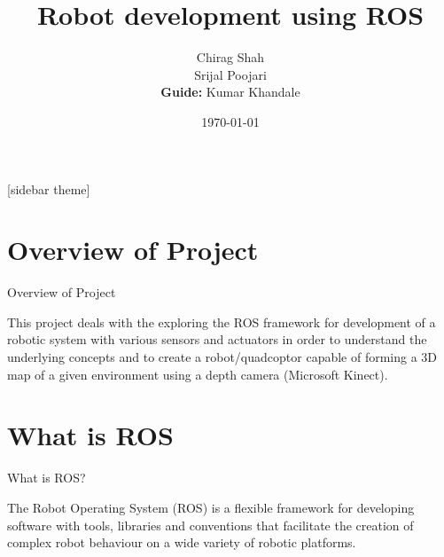 \documentclass[11pt, a4paper]{beamer}
\begin{document}
	\title{Robot development using ROS}
	
		\author
		{Chirag Shah\\ Srijal Poojari\\
		 \textbf{Guide:} Kumar Khandale			
		}

	
	\date{\today}
	\frame{\titlepage}

[sidebar theme]
\section{Overview of Project}
\begin{frame}{Overview of Project}

	
	\noindent This project deals with the exploring the ROS framework for development of a robotic system with various sensors and actuators in order to understand the underlying concepts and to create a robot/quadcoptor capable of forming a 3D map of a given environment using a depth camera (Microsoft Kinect).
	\newline
	
\end{frame}

\section{What is ROS}
\begin{frame}{What is ROS? }

The Robot Operating System (ROS) is a flexible framework for developing software  with tools, libraries and conventions that facilitate the creation of complex robot behaviour on a wide variety of robotic platforms.	
	
\end{frame}
\end{document}
